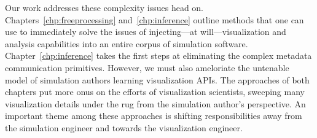 Our work addresses these complexity issues head on.
Chapters~\ref{chp:freeprocessing} and~\ref{chp:inference} outline
methods that one can use to immediately solve the issues of
injecting---at will---visualization and analysis capabilities into an
entire corpus of simulation software.  Chapter~\ref{chp:inference}
takes the first steps at eliminating the complex metadata communication
primitives.  However, we must also ameloriate the untenable model of
simulation authors learning visualization APIs.  The approaches of both
chapters put more onus on the efforts of visualization scientists,
sweeping many visualization details under the rug from the simulation
author's perspective.  An important theme among these approaches is
shifting responsibilities away from the simulation engineer and towards
the visualization engineer.
